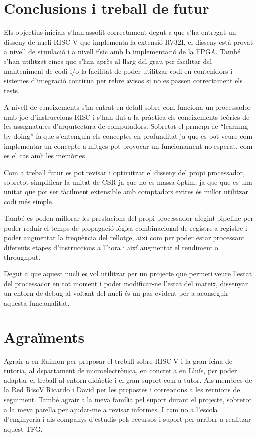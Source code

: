 \documentclass[10pt,a4paper,twocolumn,twoside]{article}
\begin{document}
\section{Conclusions i treball de futur}  %
\label{sec:conclusion}

Els objectius inicials s'han assolit correctament degut a que s'ha entregat un disseny de nucli RISC-V que implementa la extensió RV32I, el disseny està provat a nivell de simulació i a nivell físic amb la implementació de la FPGA. També s'han utilitzat eines que s'han après al llarg del grau per facilitar del manteniment de codi i/o la facilitat de poder utilitzar codi en contenidors i sistemes d'integració contínua per rebre avisos si no es passen correctament els tests.

A nivell de coneixements s'ha entrat en detall sobre com funciona un processador amb joc d'instruccions RISC i s'han dut a la pràctica els coneixements teòrics de les assignatures d'arquitectura de computadors.
Sobretot el principi de ``learning by doing'' fa que s'entenguin els conceptes en profunditat ja que es pot veure com implementar un concepte a mitges pot provocar un funcionament no esperat, com es el cas amb les memòries.

Com a treball futur es pot revisar i optimitzar el disseny del propi processador, sobretot simplificar la unitat de CSR ja que no es massa òptim, ja que que es una unitat que pot ser fàcilment extensible amb comptadors extres és millor utilitzar codi més simple.

També es poden millorar les prestacions del propi processador afegint pipeline per poder reduir el temps de propagació lògica combinacional de registre a registre i poder augmentar la freqüència del rellotge, així com per poder estar processant diferents etapes d'instruccions a l'hora i així augmentar el rendiment o throughput.

Degut a que aquest nucli es vol utilitzar per un projecte que permeti veure l'estat del processador en tot moment i poder modificar-ne l'estat del mateix, dissenyar un entorn de debug al voltant del nucli és un pas evident per a aconseguir aquesta funcionalitat.
    
    



\section*{Agraïments}

Agrair a en Raimon per proposar el treball sobre RISC-V i la gran feina de tutoria, al departament de microelectrònica, en concret a en Lluís, per poder adaptar el treball al entorn didàctic i el gran suport com a tutor. Als membres de la Red RiscV Ricardo i David per les propostes i correccions a les reunions de seguiment.
També agrair a la meva família pel suport durant el projecte, sobretot a la meva parella per ajudar-me a revisar informes. 
I com no a l'escola d'enginyeria i als companys d'estudis pels recursos i suport per arribar a realitzar aquest TFG. 
\end{document}
